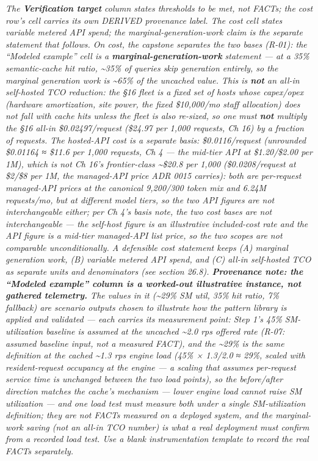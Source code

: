 \emph{The \textbf{Verification target} column states thresholds to be
met, not FACTs; the cost row's cell carries its own DERIVED provenance
label. The cost cell states \emph{variable metered API spend}; the
marginal-generation-work claim is the separate statement that follows.
On cost, the capstone separates the two bases (R-01): the ``Modeled
example'' cell is a \textbf{marginal-generation-work} statement --- at a
35\% semantic-cache hit ratio, \textasciitilde35\% of queries skip
generation entirely, so the marginal generation work is
\textasciitilde65\% of the uncached value. This is \textbf{not} an
all-in self-hosted TCO reduction: the §16 fleet is a fixed set of hosts
whose capex/opex (hardware amortization, site power, the fixed
\$10,000/mo staff allocation) does not fall with cache hits unless the
fleet is also re-sized, so one must \textbf{not} multiply the §16 all-in
\$0.02497/request (\$24.97 per 1,000 requests, Ch 16) by a fraction of
requests. The hosted-API cost is a separate basis: \$0.0116/request
(unrounded \$0.01164 ≈ \$11.6 per 1,000 requests, Ch 4 --- the
\emph{mid-tier} API at \$1.20/\$2.00 per 1M), which is not Ch 16's
\emph{frontier-class} \textasciitilde\$20.8 per 1,000 (\$0.0208/request
at \$2/\$8 per 1M, the managed-API price ADR 0015 carries): both are
per-request managed-API prices at the canonical 9,200/300 token mix and
6.24M requests/mo, but at different model tiers, so the two API figures
are not interchangeable either; per Ch 4's basis note, the two cost
bases are not interchangeable --- the self-host figure is an
illustrative included-cost rate and the API figure is a mid-tier
managed-API list price, so the two scopes are not comparable
unconditionally. A defensible cost statement keeps (A) marginal
generation work, (B) variable metered API spend, and (C) all-in
self-hosted TCO as separate units and denominators (see section 26.8).
\textbf{Provenance note: the ``Modeled example'' column is a worked-out
illustrative instance, not gathered telemetry.} The values in it
(\textasciitilde29\% SM util, 35\% hit ratio, 7\% fallback) are scenario
outputs chosen to illustrate how the pattern library is applied and
validated --- each carries its measurement point: Step 1's 45\%
SM-utilization baseline is assumed at the uncached \textasciitilde2.0
rps offered rate (R-07: assumed baseline input, not a measured FACT),
and the \textasciitilde29\% is the same definition at the cached
\textasciitilde1.3 rps engine load (45\% × 1.3/2.0 ≈ 29\%, scaled with
resident-request occupancy at the engine --- a scaling that assumes
per-request service time is unchanged between the two load points), so
the before/after direction matches the cache's mechanism --- lower
engine load cannot raise SM utilization --- and one load test must
measure both under a single SM-utilization definition; they are
\emph{not} FACTs measured on a deployed system, and the marginal-work
saving (not an all-in TCO number) is what a real deployment must confirm
from a recorded load test. Use a blank instrumentation template to
record the real FACTs separately.}

